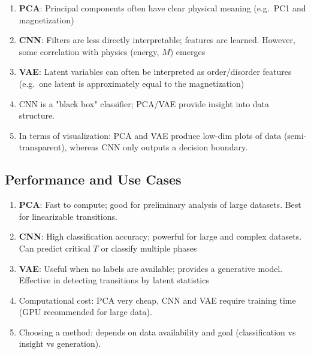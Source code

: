 \documentclass[%
oneside,                 %
final,                   %
10pt]{article}
\begin{document}
\begin{enumerate}
\item \textbf{PCA}: Principal components often have clear physical meaning (e.g.\ PC1 and  magnetization) 

\item \textbf{CNN}: Filters are less directly interpretable; features are learned. However, some correlation with physics (energy, $M$) emerges 

\item \textbf{VAE}: Latent variables can often be interpreted as order/disorder features (e.g.~one latent is approximately equal to the  magnetization) 

\item CNN is a "black box" classifier; PCA/VAE provide insight into data structure.

\item In terms of visualization: PCA and VAE produce low-dim plots of data (semi-transparent), whereas CNN only outputs a decision boundary.
\end{enumerate}

\noindent
\subsection{Performance and Use Cases}

\begin{enumerate}
\item \textbf{PCA}: Fast to compute; good for preliminary analysis of large datasets. Best for linearizable transitions.

\item \textbf{CNN}: High classification accuracy; powerful for large and complex datasets. Can predict critical $T$ or classify multiple phases 

\item \textbf{VAE}: Useful when no labels are available; provides a generative model. Effective in detecting transitions by latent statistics 

\item Computational cost: PCA very cheap, CNN and VAE require training time (GPU recommended for large data).

\item Choosing a method: depends on data availability and goal (classification vs insight vs generation).
\end{enumerate}

\noindent
\end{document}
